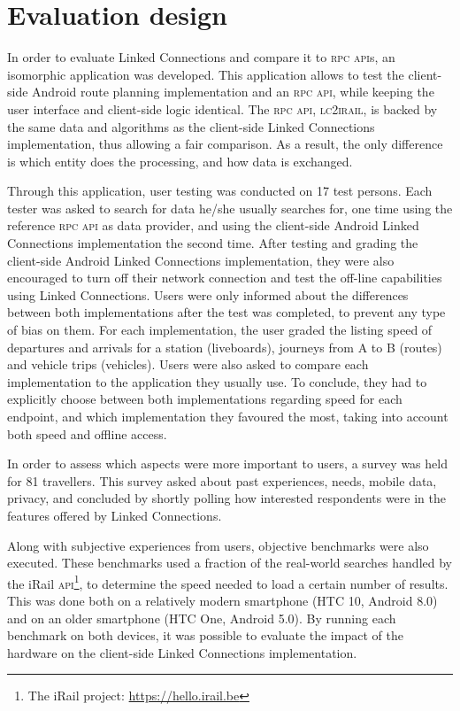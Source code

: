 \documentclass[twocolumn]{phdsymp} %
\begin{document}
\section{Evaluation design}

In order to evaluate Linked Connections and compare it to \textsc{rpc} \textsc{api}s, an isomorphic application was developed. This application allows to test the client-side Android route planning implementation and an \textsc{rpc} \textsc{api}, while keeping the user interface and client-side logic identical. The \textsc{rpc} \textsc{api}, \textsc{lc2irail}, is backed by the same data and algorithms as the client-side Linked Connections implementation, thus allowing a fair comparison. As a result, the only difference is which entity does the processing, and how data is exchanged.

Through this application, user testing was conducted on 17 test persons. Each tester was asked to search for data he/she usually searches for, one time using the reference \textsc{rpc} \textsc{api} as data provider, and using the client-side Android Linked Connections implementation the second time. After testing and grading the client-side Android Linked Connections implementation, they were also encouraged to turn off their network connection and test the off-line capabilities using Linked Connections. Users were only informed about the differences between both implementations after the test was completed, to prevent any type of bias on them. For each implementation, the user graded the listing speed of departures and arrivals for a station (liveboards), journeys from A to B (routes) and vehicle trips (vehicles). Users were also asked to compare each implementation to the application they usually use. To conclude, they had to explicitly choose between both implementations regarding speed for each endpoint, and which implementation they favoured the most, taking into account both speed and offline access.

In order to assess which aspects were more important to users, a survey was held for 81 travellers. This survey asked about past experiences, needs, mobile data, privacy, and concluded by shortly polling how interested respondents were in the features offered by Linked Connections.

Along with subjective experiences from users, objective benchmarks were also executed. These benchmarks used a fraction of the real-world searches handled by the iRail \textsc{api}\footnote{The iRail project: \url{https://hello.irail.be}}, to determine the speed needed to load a certain number of results. This was done both on a relatively modern smartphone (HTC 10, Android 8.0) and on an older smartphone (HTC One, Android 5.0). By running each benchmark on both devices, it was possible to evaluate the impact of the hardware on the client-side Linked Connections implementation.
\end{document}
